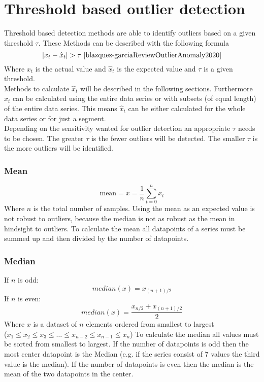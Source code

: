 \section{Threshold based outlier detection} \label{threshold-based-outlier-detection}
Threshold based detection methods are able to identify outliers based on a given threshold $\tau$. These Methods can be described with the following formula
$$
|x_t - \hat{x}_t | > \tau \text{ \cite{blazquez-garciaReviewOutlierAnomaly2020}}
$$
Where $x_t$ is the actual value and $\hat{x}_t$ is the expected value and $\tau$ is a given threshold.\\
Methods to calculate $\hat{x}_t$ will be described in the following sections. Furthermore $\hat{x}_t$ can be calculated using the entire data series or with subsets (of equal length) of the entire data series. This means $\hat{x}_t$ can be either calculated for the whole data series or for just a segment.\\
Depending on the sensitivity wanted for outlier detection an appropriate $\tau$ needs to be chosen. The greater $\tau$ is the fewer outliers will be detected. The smaller $\tau$ is the more outliers will be identified.  \cite{blazquez-garciaReviewOutlierAnomaly2020}

\subsubsection{Mean}
$$
\text{mean} = \overline{x} = \frac{1}{n} \sum^n_{t=0}x_t
$$
Where $n$ is the total number of samples. Using the mean as an expected value is not robust to outliers, because the median is not as robust as the mean in hindsight to outliers. To calculate the mean all datapoints of a series must be summed up and then divided by the number of datapoints.
\subsubsection{Median}
If $n$ is odd:
$$
median(x) = x_{(n+1)/2}
$$
If $n$ is even:
$$
median(x) = \frac{x_{n/2} + x_{(n+1)/2}}{2}
$$
Where $x$ is a dataset of $n$ elements ordered from smallest to largest\\
($x_1 \leq x_2 \leq x_3 \leq \ldots \leq x_{n-2} \leq x_{n-1} \leq x_n$)
\cite{blazquez-garciaReviewOutlierAnomaly2020}
To calculate the median all values must be sorted from smallest to largest. If the number of datapoints is odd then the most center datapoint is the Median (e.g. if the series consist of 7 values the third value is the median). If the number of datapoints is even then the median is the mean of the two datapoints in the center.
